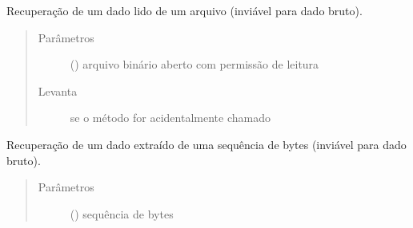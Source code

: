 \documentclass[letterpaper,10pt,brazil]{sphinxmanual}
\begin{document}
\begin{fulllineitems}

\begin{fulllineitems}
\label{\detokenize{estrutarq.dado:estrutarq.dado.DadoBruto.leia_de_arquivo}}
\pysigstartsignatures
{}
\pysigstopsignatures
\sphinxAtStartPar
Recuperação de um dado lido de um arquivo (inviável para
dado bruto).
\begin{quote}\begin{description}
\item[{Parâmetros}] \leavevmode
\sphinxAtStartPar
{} () \textendash{} arquivo binário aberto com permissão de leitura

\item[{Levanta}] \leavevmode
\sphinxAtStartPar
{} \textendash{} se o método for acidentalmente chamado

\end{description}\end{quote}

\end{fulllineitems}


\begin{fulllineitems}
\label{\detokenize{estrutarq.dado:estrutarq.dado.DadoBruto.leia_de_bytes}}
\pysigstartsignatures
{}
\pysigstopsignatures
\sphinxAtStartPar
Recuperação de um dado extraído de uma sequência de bytes (inviável
para dado bruto).
\begin{quote}\begin{description}
\item[{Parâmetros}] \leavevmode
\sphinxAtStartPar
{} () \textendash{} sequência de bytes


\end{description}
\end{quote}
\end{fulllineitems}
\end{fulllineitems}
\end{document}
